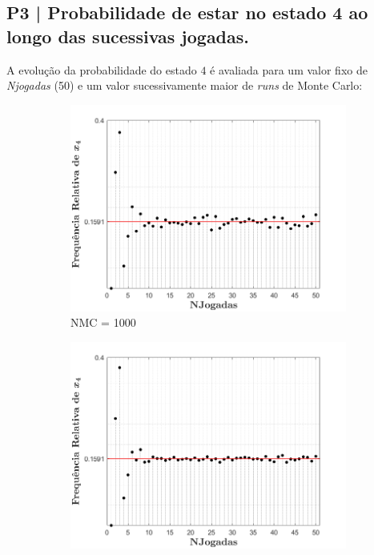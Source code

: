 \clearpage
\subsection{P3 | Probabilidade de estar no estado 4 ao longo das sucessivas jogadas.}
\label{subsec:P3}
A evolução da probabilidade do estado $4$ é avaliada para um valor fixo de \textit{Njogadas} (50) e um valor sucessivamente maior de \textit{runs} de Monte Carlo:

\begin{figure}[ht] 
    \begin{subfigure}[b]{0.5\linewidth}
        \centering
        \includegraphics[width=1\linewidth]{img/P3/P31000.png}
        \caption{NMC = 1000} 
        \label{fig:P31000} 
        \vspace{1ex}
    \end{subfigure}%
    \begin{subfigure}[b]{0.5\linewidth}
        \centering
        \includegraphics[width=1\linewidth]{img/P3/P310000.png} 

\end{subfigure}
\end{figure}
